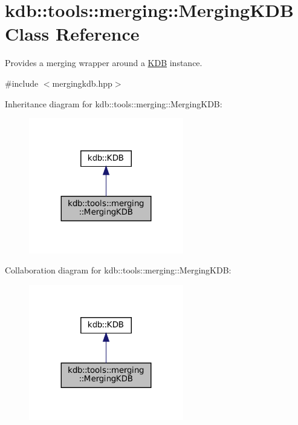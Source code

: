 \hypertarget{classkdb_1_1tools_1_1merging_1_1MergingKDB}{}\section{kdb\+::tools\+::merging\+::Merging\+K\+DB Class Reference}
\label{classkdb_1_1tools_1_1merging_1_1MergingKDB}


Provides a merging wrapper around a \mbox{\hyperlink{classkdb_1_1KDB}{K\+DB}} instance.  




{\ttfamily \#include $<$mergingkdb.\+hpp$>$}



Inheritance diagram for kdb\+::tools\+::merging\+::Merging\+K\+DB\+:
\nopagebreak
\begin{figure}[H]
\begin{center}
\leavevmode
\includegraphics[width=191pt]{classkdb_1_1tools_1_1merging_1_1MergingKDB__inherit__graph}
\end{center}
\end{figure}


Collaboration diagram for kdb\+::tools\+::merging\+::Merging\+K\+DB\+:
\nopagebreak
\begin{figure}[H]
\begin{center}
\leavevmode
\includegraphics[width=191pt]{classkdb_1_1tools_1_1merging_1_1MergingKDB__coll__graph}
\end{center}
\end{figure}
